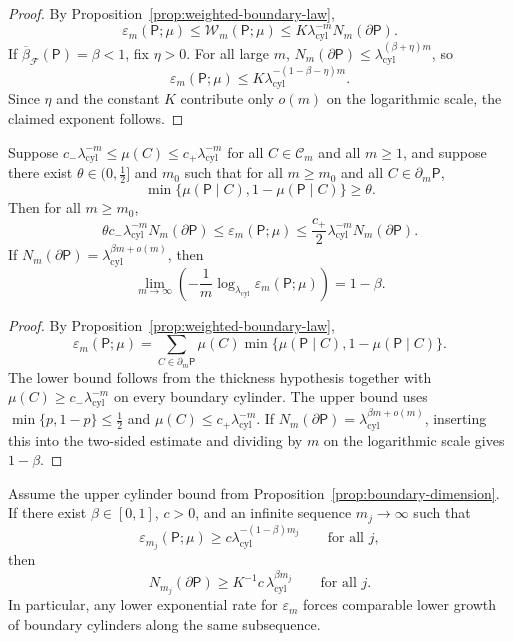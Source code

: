 \begin{proof}
By Proposition~\ref{prop:weighted-boundary-law},
\[
\varepsilon_m(\mathsf{P};\mu)\le \mathcal{W}_m(\mathsf{P};\mu)
\le K\lambda_{\mathrm{cyl}}^{-m}N_m(\partial\mathsf{P}).
\]
If $\overline{\beta}_{\mathcal{F}}(\mathsf{P})=\beta<1$, fix $\eta>0$.
For all large $m$,
$N_m(\partial\mathsf{P})\le\lambda_{\mathrm{cyl}}^{(\beta+\eta)m}$, so
\[
\varepsilon_m(\mathsf{P};\mu)\le
K\lambda_{\mathrm{cyl}}^{-(1-\beta-\eta)m}.
\]
Since $\eta$ and the constant $K$ contribute only $o(m)$ on the logarithmic
scale, the claimed exponent follows.
\end{proof}

\begin{proposition}
\label{prop:volume-boundary-scaling}
Suppose $c_-\lambda_{\mathrm{cyl}}^{-m}\le\mu(C)\le c_+\lambda_{\mathrm{cyl}}^{-m}$
for all $C\in\mathcal{C}_m$ and all $m\ge 1$, and suppose there exist
$\theta\in(0,\frac12]$ and $m_0$ such that for all $m\ge m_0$ and all
$C\in\partial_m\mathsf{P}$,
\[
\min\{\mu(\mathsf{P}\mid C),1-\mu(\mathsf{P}\mid C)\}\ge\theta.
\]
Then for all $m\ge m_0$,
\[
\theta c_-\lambda_{\mathrm{cyl}}^{-m}N_m(\partial\mathsf{P})
\le\varepsilon_m(\mathsf{P};\mu)
\le\frac{c_+}{2}\lambda_{\mathrm{cyl}}^{-m}N_m(\partial\mathsf{P}).
\]
If $N_m(\partial\mathsf{P})=\lambda_{\mathrm{cyl}}^{\beta m+o(m)}$, then
\[
\lim_{m\to\infty}\left(-\frac{1}{m}
\log_{\lambda_{\mathrm{cyl}}}\varepsilon_m(\mathsf{P};\mu)\right)=1-\beta.
\]
\end{proposition}

\begin{proof}
By Proposition~\ref{prop:weighted-boundary-law},
\[
\varepsilon_m(\mathsf{P};\mu)
=\sum_{C\in\partial_m\mathsf{P}}
\mu(C)\min\{\mu(\mathsf{P}\mid C),1-\mu(\mathsf{P}\mid C)\}.
\]
The lower bound follows from the thickness hypothesis together with
$\mu(C)\ge c_-\lambda_{\mathrm{cyl}}^{-m}$ on every boundary cylinder.  The
upper bound uses $\min\{p,1-p\}\le\frac12$ and
$\mu(C)\le c_+\lambda_{\mathrm{cyl}}^{-m}$.  If
$N_m(\partial\mathsf{P})=\lambda_{\mathrm{cyl}}^{\beta m+o(m)}$, inserting this
into the two-sided estimate and dividing by $m$ on the logarithmic scale gives
$1-\beta$.
\end{proof}

\begin{proposition}
\label{prop:boundary-growth-necessary}
Assume the upper cylinder bound from Proposition~\ref{prop:boundary-dimension}.  If
there exist $\beta\in[0,1]$, $c>0$, and an infinite sequence $m_j\to\infty$
such that
\[
\varepsilon_{m_j}(\mathsf{P};\mu)\ge c\lambda_{\mathrm{cyl}}^{-(1-\beta)m_j}
\qquad\text{for all }j,
\]
then
\[
N_{m_j}(\partial\mathsf{P})\ge
K^{-1}c\,\lambda_{\mathrm{cyl}}^{\beta m_j}
\qquad\text{for all }j.
\]
In particular, any lower exponential rate for $\varepsilon_m$ forces
comparable lower growth of boundary cylinders along the same subsequence.
\end{proposition}

